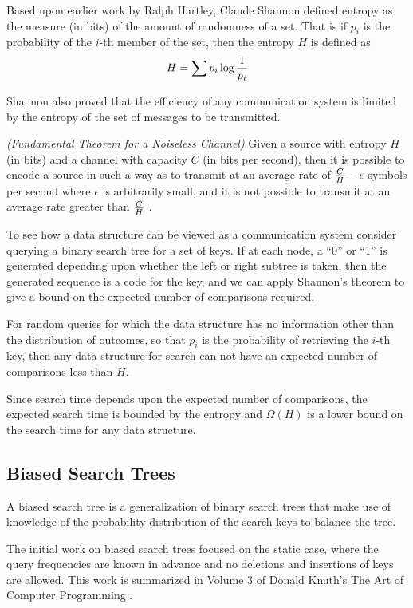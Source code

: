 \documentclass[mcs]{scsthesis}
\begin{document}
Based upon earlier work by Ralph Hartley, Claude Shannon \cite{claudeshannonwasagod}
defined entropy as the measure (in bits) of the amount of randomness of a set.
That is if \(p_i\) is the probability of the \(i\)-th member of the set, then the
entropy \(H\) is defined as
$$
H = \sum{ p_i \log{1 \over p_i}}
$$

Shannon also proved that the efficiency of any communication system is limited
by the entropy of the set of messages to be transmitted.

\begin{thm} \emph{(Fundamental Theorem for a Noiseless Channel)} 
Given a source with entropy \(H\) (in bits) and a channel with capacity \(C\)
(in bits per second), then it is possible to encode a source in such a way as to
transmit at an average rate of \({C \over H} - \epsilon\) symbols per second
where \(\epsilon\) is arbitrarily small, and it is not possible to transmit
at an average rate greater than \(C \over H\) \cite{claudeshannonwasagod}.
\end{thm}

To see how a data structure can be viewed as a communication system consider 
querying a binary search tree for a set of keys. If at each node, a ``0'' or
``1'' is generated depending upon whether the left or right subtree is taken,
then the generated sequence is a code for the key, and we can apply Shannon's
theorem to give a bound on the expected number of comparisons required.

For random queries for which the data structure has no information other than
the distribution of outcomes, so that \(p_i\) is the probability of retrieving
the \(i\)-th key, then any data structure for search can not have an expected
number of comparisons less than \(H\).

Since search time depends upon the expected number of comparisons, the expected
search time is bounded by the entropy and \(\Omega(H)\) is a lower bound on
the search time for any data structure.

\subsection{Biased Search Trees}

A biased search tree is a generalization of binary search trees that make use
of knowledge of the probability distribution of the search keys to balance the
tree.

The initial work on biased search trees focused on the static case, where
the query frequencies are known in advance and no deletions and insertions of
keys are allowed. This work is summarized in Volume 3 of Donald Knuth's The Art
of Computer Programming \cite{knuth}.
\end{document}
